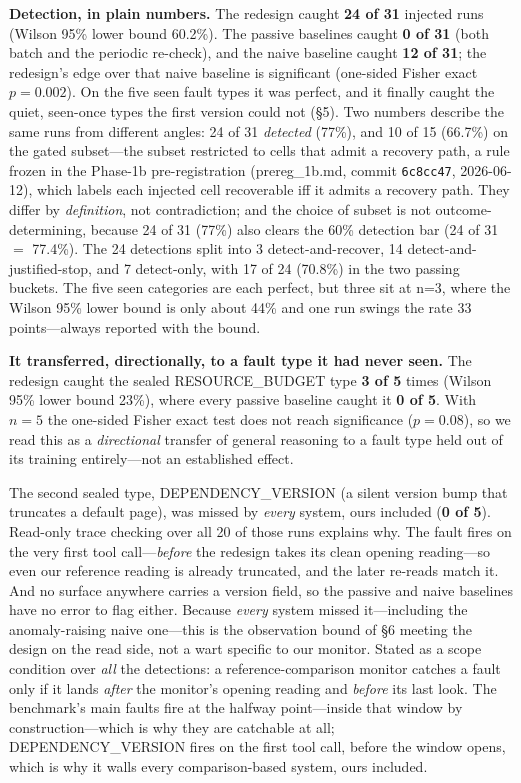 \documentclass[acmsmall,screen]{acmart}
\begin{document}
\textbf{Detection, in plain numbers.} The redesign caught \textbf{24 of 31}
injected runs (Wilson 95\% lower bound 60.2\%). The passive baselines caught
\textbf{0 of 31} (both batch and the periodic re-check), and the naive baseline
caught \textbf{12 of 31}; the redesign's edge over that naive baseline is
significant (one-sided Fisher exact $p=0.002$). On the five seen fault types it
was perfect, and it finally caught the quiet, seen-once types the first version
could not (\S5). Two numbers describe the same runs from different angles: 24 of
31 \emph{detected} (77\%), and 10 of 15 (66.7\%) on the gated subset---the subset
restricted to cells that admit a recovery path, a rule frozen in the
Phase-1b pre-registration (prereg\_1b.md, commit \texttt{6c8cc47}, 2026-06-12), which
labels each injected cell recoverable iff it admits a recovery path. They differ by \emph{definition}, not contradiction; and the
choice of subset is not outcome-determining, because 24 of 31 (77\%) also clears
the 60\% detection bar (24 of 31 $=$ 77.4\%). The 24 detections split into 3 detect-and-recover, 14
detect-and-justified-stop, and 7 detect-only, with 17 of 24 (70.8\%) in the two
passing buckets. The five seen categories are each perfect, but three sit at
n=3, where the Wilson 95\% lower bound is only about 44\% and one run swings the
rate 33 points---always reported with the bound.

\textbf{It transferred, directionally, to a fault type it had never seen.} The
redesign caught the sealed RESOURCE\_BUDGET type \textbf{3 of 5} times (Wilson
95\% lower bound 23\%), where every passive baseline caught it \textbf{0 of 5}.
With $n=5$ the one-sided Fisher exact test does not reach significance
($p=0.08$), so we read this as a \emph{directional} transfer of general reasoning
to a fault type held out of its training entirely---not an established effect.

The second sealed type, DEPENDENCY\_VERSION (a silent version bump that
truncates a default page), was missed by \emph{every} system, ours included
(\textbf{0 of 5}). Read-only trace checking over all 20 of those runs explains
why. The fault fires on the very first tool call---\emph{before} the redesign
takes its clean opening reading---so even our reference reading is already
truncated, and the later re-reads match it. And no surface anywhere carries a
version field, so the passive and naive baselines have no error to flag either.
Because \emph{every} system missed it---including the anomaly-raising naive
one---this is the observation bound of \S6 meeting the design on the read side,
not a wart specific to our monitor. Stated as a scope condition over \emph{all}
the detections: a reference-comparison monitor catches a fault only if it lands
\emph{after} the monitor's opening reading and \emph{before} its last look. The
benchmark's main faults fire at the halfway point---inside that window by
construction---which is why they are catchable at all; DEPENDENCY\_VERSION fires
on the first tool call, before the window opens, which is why it walls every
comparison-based system, ours included.
\end{document}
